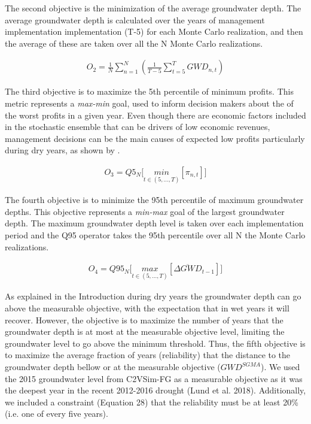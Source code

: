 \documentclass[11pt,a4paper]{article}
\begin{document}
The second objective is the minimization of the average groundwater depth. The average groundwater depth is calculated over the years of management implementation implementation (T-5) for each Monte Carlo realization, and then the average of these are taken over all the N Monte Carlo realizations. 

\begin{align}
O_{2} = \frac{1}{N}\sum_{n=1}^N(\frac{1}{T-5}\sum_{t=5}^T GWD_{n,t})
\end{align}

The third objective is to maximize the 5th percentile of minimum profits. This metric represents a \textit{max-min} goal, used to inform decision makers about the of the worst profits in a given year. Even though there are economic factors included in the stochastic ensemble that can be drivers of low economic revenues, management decisions can be the main causes of expected low profits particularly during dry years, as shown by \textcite{rodriguez-flores_global_2022}. 

\begin{align}
O_{3} = Q5_{N} \bigg[\underset{t\in(5,...,T)}{min}[\pi_{n,t}]\bigg]
\end{align}

The fourth objective is to minimize the 95th percentile of maximum groundwater depths. This objective represents a \textit{min-max} goal of the largest groundwater depth. The maximum groundwater depth level is taken over each implementation period and the Q95 operator takes the 95th percentile over all N the Monte Carlo  realizations. 

\begin{align}
O_{4} = Q95_{N} \bigg[\underset{t\in(5,...,T)}{max}[\overline{\Delta GWD}_{t-1}]\bigg]
\end{align}

As explained in the Introduction during dry years the groundwater depth can go above the measurable objective, with the expectation that in wet years it will recover. However, the objective is to maximize the number of years that the groundwater depth is at most at the measurable objective level, limiting the groundwater level to go above the minimum threshold. Thus, the fifth objective is to maximize the average fraction of years (reliability) that the distance to the groundwater depth bellow or at the measurable objective ($GWD^{SGMA}$). We used the 2015 groundwater level from C2VSim-FG as a measurable objective as it was the deepest year in the recent 2012-2016 drought (Lund et al. 2018). Additionally, we included a constraint (Equation 28) that the reliability must be at least 20\% (i.e. one of every five years). 
\end{document}
